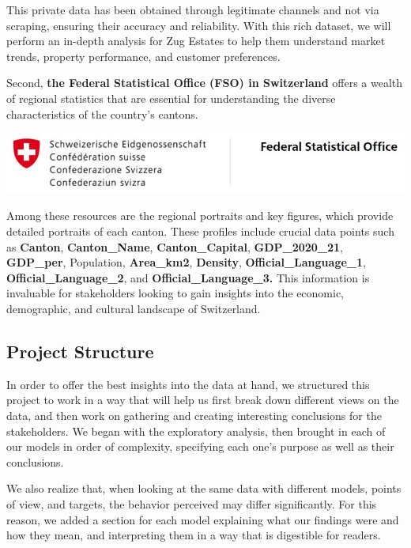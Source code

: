 \documentclass[
]{article}
\begin{document}
This private data has been obtained through legitimate channels and not
via scraping, ensuring their accuracy and reliability. With this rich
dataset, we will perform an in-depth analysis for Zug Estates to help
them understand market trends, property performance, and customer
preferences.

Second, \textbf{the Federal Statistical Office (FSO) in Switzerland}
offers a wealth of regional statistics that are essential for
understanding the diverse characteristics of the country's cantons.

\includegraphics[width=14in,height=\textheight]{images/federal.JPG}

Among these resources are the regional portraits and key figures, which
provide detailed portraits of each canton. These profiles include
crucial data points such as \textbf{Canton}, \textbf{Canton\_Name},
\textbf{Canton\_Capital}, \textbf{GDP\_2020\_21}, \textbf{GDP\_per},
Population, \textbf{Area\_km2}, \textbf{Density},
\textbf{Official\_Language\_1}, \textbf{Official\_Language\_2}, and
\textbf{Official\_Language\_3.} This information is invaluable for
stakeholders looking to gain insights into the economic, demographic,
and cultural landscape of Switzerland.

\subsection{Project Structure}\label{project-structure}

In order to offer the best insights into the data at hand, we structured
this project to work in a way that will help us first break down
different views on the data, and then work on gathering and creating
interesting conclusions for the stakeholders. We began with the
exploratory analysis, then brought in each of our models in order of
complexity, specifying each one's purpose as well as their conclusions.

We also realize that, when looking at the same data with different
models, points of view, and targets, the behavior perceived may differ
significantly. For this reason, we added a section for each model
explaining what our findings were and how they mean, and interpreting
them in a way that is digestible for readers.
\end{document}
